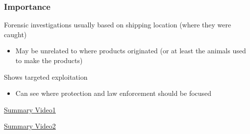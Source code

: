 \documentclass[10pt]{beamer}
\begin{document}
\begin{frame}[t]
\frametitle{Importance}
\vspace{0.5cm}

	Forensic investigations usually based on \textcolor{myblue}{shipping location} (where they were caught)\\
	\medskip
		\begin{itemize}
			\item May be unrelated to where products originated (or at least the animals used to make the products)
		\end{itemize}	
	
	\vspace{0.5cm}
	
	Shows targeted exploitation
	\medskip
		\begin{itemize}
			\item Can see where protection and law enforcement should be focused
		\end{itemize}
	
	\vspace{0.5cm}
	
\end{frame}


\begin{frame}

	\begin{center}
		\href{https://www.youtube.com/watch?v=Ojvy4njnDQg}{\Large{Summary Video1}}
	\end{center}	
\end{frame}


\begin{frame}

	\begin{center}
		\href{http://www.cbsnews.com/videos/poachers-threaten-survival-of-the-african-elephant}{\Large{Summary Video2}}
	\end{center}	
\end{frame}
\end{document}
